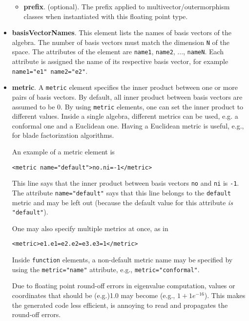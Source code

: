 \documentclass[10pt, a4paper]{article}
\begin{document}
\begin{itemize}
\begin{itemize}
            
       \item {\bf prefix}. (optional). The prefix applied to multivector/outermorphism classes when instantiated with this
            floating point type.
            
       \end{itemize}
       
\item {\bf basisVectorNames}. This element lists the names of basis vectors of the algebra. The number of basis vectors
      must match the dimension {\tt N} of the space. The attributes of the element are {\tt name1}, {\tt name2}, 
      ..., {\tt nameN}. Each attribute is assigned the name of its respective basis vector, for example {\tt name1="e1" name2="e2"}.
      
\item {\bf metric}. A {\tt metric} element specifies the inner product between one or more pairs of basis vectors.
      By default, all inner product between basis vectors are assumed to be 0. By using {\tt metric} elements, one can
      set the inner product to different values. Inside a single algebra, different metrics can be used, e.g. a conformal one and
      a Euclidean one. Having a Euclidean metric is useful, e.g., for blade factorization algorithms.
      
      An example of a metric element is 
\begin{verbatim}
<metric name="default">no.ni=-1</metric>
\end{verbatim}
      This line says that the inner product between basis vectors {\tt no} and {\tt ni} is {\tt -1}.
      The attribute {\tt name="default"} says that this line belongs to the {\tt default} metric and may be
      left out (because the default value for this attribute \emph{is} {\tt "default"}).
      
      One may also specify multiple metrics at once, as in
\begin{verbatim}
<metric>e1.e1=e2.e2=e3.e3=1</metric>
\end{verbatim}
      Inside {\tt function} elements, a non-default metric name may be specified by using the 
      {\tt metric="name"} attribute, e.g., {\tt metric="conformal"}.
      
      Due to floating point round-off errors in eigenvalue computation, values or
      coordinates that should be (e.g.)1.0 may become (e.g., $1 + 1e^{-16}$).
      This makes the generated code less efficient, is annoying to read and propagates
      the round-off errors.
      

\end{itemize}
\end{document}
